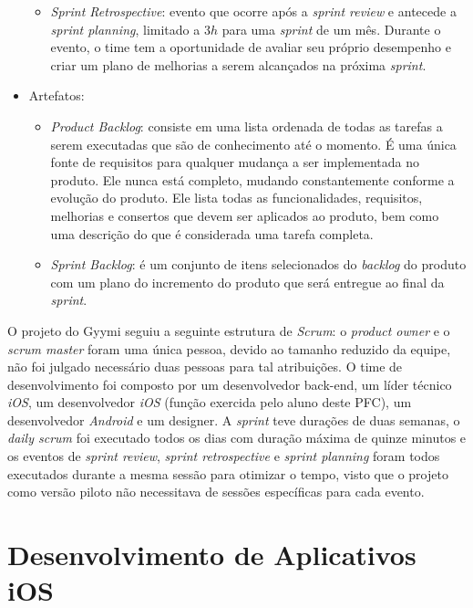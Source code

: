 \begin{itemize}
\begin{itemize}
        \item \textit{Sprint Retrospective}: evento que ocorre após a \textit{sprint review} e antecede a \textit{sprint planning}, limitado a $3h$ para uma \textit{sprint} de um mês. Durante o evento, o time tem a oportunidade de avaliar seu próprio desempenho e criar um plano de melhorias a serem alcançados na próxima \textit{sprint}.
    \end{itemize}
    \item Artefatos:
    \begin{itemize}
        \item \textit{Product Backlog}: consiste em uma lista ordenada de todas as tarefas a serem executadas que são de conhecimento até o momento. É uma única fonte de requisitos para qualquer mudança a ser implementada no produto. Ele nunca está completo, mudando constantemente conforme a evolução do produto. Ele lista todas as funcionalidades, requisitos, melhorias e consertos que devem ser aplicados ao produto, bem como uma descrição do que é considerada uma tarefa completa.
        \item \textit{Sprint Backlog}: é um conjunto de itens selecionados do \textit{backlog} do produto com um plano do incremento do produto que será entregue ao final da \textit{sprint}.
    \end{itemize}
\end{itemize}

O projeto do Gyymi seguiu a seguinte estrutura de \textit{Scrum}: o \textit{product owner} e o \textit{scrum master} foram uma única pessoa, devido ao tamanho reduzido da equipe, não foi julgado necessário duas pessoas para tal atribuições. O time de desenvolvimento foi composto por um desenvolvedor back-end, um líder técnico \textit{iOS}, um desenvolvedor \textit{iOS} (função exercida pelo aluno deste PFC), um desenvolvedor \textit{Android} e um designer. A \textit{sprint} teve durações de duas semanas, o \textit{daily scrum} foi executado todos os dias com duração máxima de quinze minutos e os eventos de \textit{sprint review}, \textit{sprint retrospective} e \textit{sprint planning} foram todos executados durante a mesma sessão para otimizar o tempo, visto que o projeto como versão piloto não necessitava de sessões específicas para cada evento.

\section{Desenvolvimento de Aplicativos iOS}

